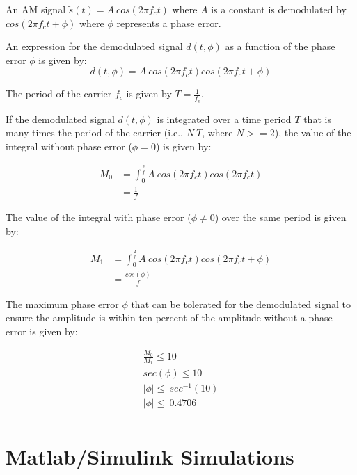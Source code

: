 \documentclass[letterpaper,12pt]{article}
\begin{document}
An AM signal $\tilde{s}(t)=A\ cos(2 \pi f_{c}t)$ where $A$ is a constant is
demodulated by $cos(2 \pi f_{c}t+\phi)$ where $\phi$ represents a phase error.

An expression for the demodulated signal $d(t,\phi)$ as a function of the phase
error $\phi$ is given by:
\begin{equation}
d(t,\phi)=A\ cos(2 \pi f_{c}t)cos(2 \pi f_{c}t+\phi)
\end{equation}

The period of the carrier $f_{c}$ is given by $T=\frac{1}{f_{c}}$.

If the demodulated signal $d(t,\phi)$ is integrated over a time period $T$ that
is many times the period of the carrier (i.e., $N\ T$, where $N >= 2$), the value
of the integral without phase error ($\phi=0$) is given by:

\begin{equation}
\begin{split}
M_{0} & = \int_{0}^{\frac{2}{f}}A\ cos(2\pi f_{c}t)cos(2\pi f_{c}t) \\
 & = \frac{1}{f}
\end{split}
\end{equation}

The value of the integral with phase error ($\phi\neq0$) over the same period is
given by:

\begin{equation}
\begin{split}
M_{1} & = \int_{0}^{\frac{2}{f}}A\ cos(2\pi f_{c}t)cos(2\pi f_{c}t+\phi) \\
 & = \frac{cos(\phi)}{f}
\end{split}
\end{equation}

The maximum phase error $\phi$ that can be tolerated for the demodulated signal
to ensure the amplitude is within ten percent of the amplitude without a phase
error is given by:

\begin{equation}
\begin{split}
\frac{M_{0}}{M_{1}}\leq10 \\
sec(\phi)\leq10 \\
|\phi|\leq\ sec^{-1}(10) \\
|\phi|\leq\ 0.4706 \\
\end{split}
\end{equation}

\section{Matlab/Simulink Simulations}
\end{document}
